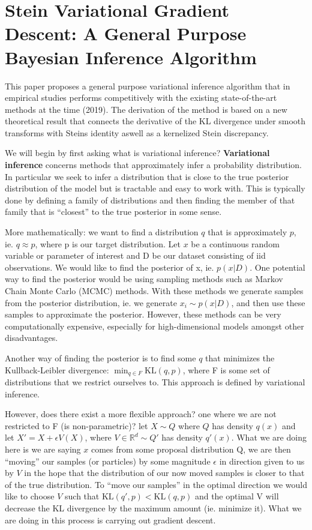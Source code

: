 \section{Stein Variational Gradient Descent: A General Purpose Bayesian Inference Algorithm \cite{liu2016stein}}
This paper proposes a general purpose variational inference algorithm that in empirical studies performs competitively with the existing state-of-the-art methods at the time (2019). The derivation of the method is based on a new theoretical result that connects the derivative of the KL divergence under smooth transforms with Steins identity aswell as a  kernelized Stein discrepancy. 

We will begin by first asking what is variational inference? \textbf{Variational inference} concerns methods that approximately infer a probability distribution. In particular we seek to infer a distribution that is close to the true posterior distribution of the model but is tractable and easy to work with. This is typically done by defining a family of distributions and then finding the member of that family that is ``closest'' to the true posterior in some sense. 

More mathematically: we want to find a distribution $q$ that is approximately $p$, ie. $q \approx p$, where p is our target distribution. Let $x$ be a continuous random variable or parameter of interest and D be our dataset consisting of iid observations. We would like to find the posterior of x, ie. $p(x|D)$. One potential way to find the posterior would be using sampling methods such as Markov Chain Monte Carlo (MCMC) methods. With these methods we generate samples from the posterior distribution, ie. we generate $x_{i} \sim p(x|D)$, and then use these samples to approximate the posterior. However, these methods can be very computationally expensive, especially for high-dimensional models amongst other disadvantages.

Another way of finding the posterior is to find some $q$ that minimizes the Kullback-Leibler divergence: $\min_{q \in F} \text{KL}(q,p)$, where F is some set of distributions that we restrict ourselves to. This approach is defined by variational inference.

However, does there exist a more flexible approach? one where we are not restricted to F (is non-parametric)? let $X \sim Q$ where $Q$ has density $q(x)$ and let $X'=X+ \epsilon V(X)$, where $V \in \mathbb{R}^{d} \sim Q'$ has density $q'(x)$. What we are doing here is we are saying $x$ comes from some proposal distribution Q, we are then ``moving'' our samples (or particles) by some magnitude $\epsilon$ in direction given to us by $V$ in the hope that the distribution of our now moved samples is closer to that of the true distribution. To ``move our samples'' in the optimal direction we would like to choose $V$ such that $\text{KL}(q',p) < \text{KL}(q,p)$ and the optimal V will decrease the KL divergence by the maximum amount (ie. minimize it). What we are doing in this process is carrying out gradient descent.

